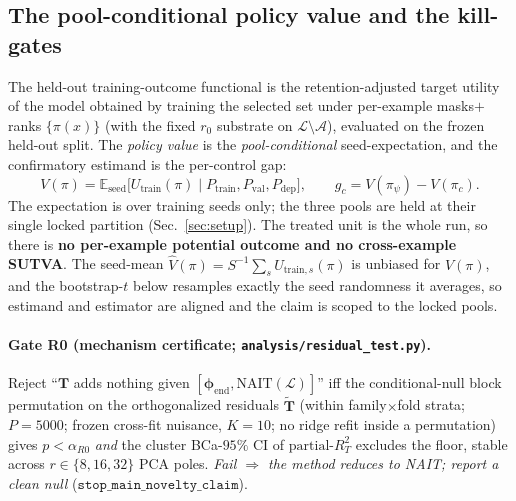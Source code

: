 \documentclass[11pt]{article}
\theoremstyle{definition}
\newcommand{\phend}{\bm{\phi}_{\mathrm{end}}}
\newcommand{\Tmat}{\mathbf{T}}
\newcommand{\Ttil}{\widetilde{\mathbf{T}}}
\newcommand{\E}{\mathbb{E}}
\newcommand{\Aset}{\mathcal{A}}
\newcommand{\Lset}{\mathcal{L}}
\newcommand{\Utr}{U_{\mathrm{train}}}
\newcommand{\Vpol}{V}
\begin{document}
\subsection{The pool-conditional policy value and the kill-gates}
\label{sec:gates}
The held-out training-outcome functional is the retention-adjusted target utility of the
model obtained by training the selected set under per-example masks$+$ranks $\{\pi(x)\}$
(with the fixed $r_0$ substrate on $\Lset\setminus\Aset$), evaluated on the frozen
held-out split. The \emph{policy value} is the \emph{pool-conditional} seed-expectation,
and the confirmatory estimand is the per-control gap:
\begin{equation}
\Vpol(\pi)=\E_{\mathrm{seed}}\big[\Utr(\pi)\mid P_{\mathrm{train}},P_{\mathrm{val}},P_{\mathrm{dep}}\big],
\qquad g_c=\Vpol(\pi_\psi)-\Vpol(\pi_c).
\label{eq:V}
\end{equation}
The expectation is over training seeds only; the three pools are held at their single
locked partition (Sec.~\ref{sec:setup}). The treated unit is the whole run, so there is
\textbf{no per-example potential outcome and no cross-example SUTVA}. The seed-mean
$\widehat\Vpol(\pi)=S^{-1}\sum_s U_{\mathrm{train},s}(\pi)$ is unbiased for $\Vpol(\pi)$, and the
bootstrap-$t$ below resamples exactly the seed randomness it averages, so estimand and
estimator are aligned and the claim is scoped to the locked pools.

\paragraph{Gate R0 (mechanism certificate; \texttt{analysis/residual\_test.py}).}
Reject ``$\Tmat$ adds nothing given $[\phend,\mathrm{NAIT}(\Lset)]$'' iff the
conditional-null block permutation on the orthogonalized residuals $\Ttil$ (within
family$\times$fold strata; $P{=}5000$; frozen cross-fit nuisance, $K{=}10$; no ridge refit
inside a permutation) gives $p<\alpha_{R0}$ \emph{and} the cluster BCa-$95\%$ CI of
$\mathrm{partial\text{-}}R^2_T$ excludes the floor, stable across $r\in\{8,16,32\}$ PCA
poles. \emph{Fail $\Rightarrow$ the method reduces to NAIT; report a clean null}
($\texttt{stop\_main\_novelty\_claim}$).
\end{document}
